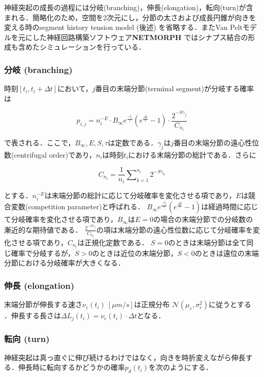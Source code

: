 神経突起の成長の過程には分岐(branching)，伸長(elongation)，転向(turn)が含まれる．簡略化のため，空間を2次元にし，分節の太さおよび成長円錐が向きを変える時のsegment history tension model (後述) を省略する．またVan Peltモデルを元にした神経回路構築ソフトウェア\textbf{NETMORPH} \cite{Koene2009-hv}ではシナプス結合の形成も含めたシミュレーションを行っている．

\subsubsection{分岐 (branching)}
時刻$[t_i, t_i + \Delta t]$において，$j$番目の末端分節(terminal segment)が分岐する確率は


\begin{equation}
p_{i,j} = n_i^{-E}\cdot B_{\infty} e^{\frac{-t_i}{\tau}} \left(e^{\frac{\Delta t}{\tau}} - 1\right)\cdot \frac{2^{-S\gamma_j}}{C_{n_i}}
\end{equation}


で表される．ここで，$B_{\infty}, E, S, \tau$は定数である．$\gamma_j$は$j$番目の末端分節の遠心性位数(centrifugal order)であり，$n_i$は時刻$t_i$における末端分節の総計である．さらに


\begin{equation}
{C_{n_i}} = \frac{1}{n_i}\sum\nolimits_{k = 1}^{n_i} {{2^{ - S{\gamma_k}}}}
\end{equation}


とする．$n_i^{-E}$は末端分節の総計に応じて分岐確率を変化させる項であり，$E$は競合変数(competition parameter)と呼ばれる．
$B_{\infty} e^{\frac{-t_i}{\tau}} \left(e^{\frac{\Delta t}{\tau}} - 1\right)$は経過時間に応じて分岐確率を変化させる項であり，$B_{\infty}$は$E=0$の場合の末端分節での分岐数の漸近的な期待値である．
$\frac{2^{-S\gamma_j}}{C_{n_i}}$の項は末端分節の遠心性位数に応じて分岐確率を変化させる項であり，$C_{n_i}$は正規化定数である．
$S=0$のときは末端分節は全て同じ確率で分岐するが，$S>0$のときは近位の末端分節，$S<0$のときは遠位の末端分節における分岐確率が大きくなる．

\subsubsection{伸長 (elongation) }
末端分節が伸長する速さ$\nu_e(t_i)\ [\mu m/s]$は正規分布 $\mathcal{N}(\mu_e, \sigma_e^2)$に従うとする \cite{Van_Ooyen2014-fb}．伸長する長さは$\Delta L_j(t_i)=\nu_e(t_i) \cdot \Delta t$となる．

\subsubsection{転向 (turn)}
神経突起は真っ直ぐに伸び続けるわけではなく，向きを時折変えながら伸長する．伸長時に転向するかどうかの確率$p_d(t_i)$を次のようにする．



